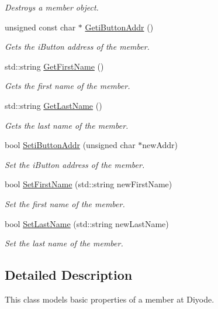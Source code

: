 \begin{DoxyCompactItemize}
\begin{DoxyCompactList}\small\item\em Destroys a member object. \end{DoxyCompactList}\item 
unsigned const char $\ast$ \hyperlink{class_member_acbcc21c318cc1ebb2d5e7d43940d51cf}{Geti\-Button\-Addr} ()
\begin{DoxyCompactList}\small\item\em Gets the i\-Button address of the member. \end{DoxyCompactList}\item 
std\-::string \hyperlink{class_member_a0c06d526ea58beed3ce782f4599e0a8b}{Get\-First\-Name} ()
\begin{DoxyCompactList}\small\item\em Gets the first name of the member. \end{DoxyCompactList}\item 
std\-::string \hyperlink{class_member_aadc78fb6f531930442cc1244455fda80}{Get\-Last\-Name} ()
\begin{DoxyCompactList}\small\item\em Gets the last name of the member. \end{DoxyCompactList}\item 
bool \hyperlink{class_member_a196f091ea8067c5777b2b07184b0b6e1}{Seti\-Button\-Addr} (unsigned char $\ast$new\-Addr)
\begin{DoxyCompactList}\small\item\em Set the i\-Button address of the member. \end{DoxyCompactList}\item 
bool \hyperlink{class_member_adce4ba240d1ee7251d3dd832370d55d9}{Set\-First\-Name} (std\-::string new\-First\-Name)
\begin{DoxyCompactList}\small\item\em Set the first name of the member. \end{DoxyCompactList}\item 
bool \hyperlink{class_member_a8ab627d627dc4a9aa572ed94f492c328}{Set\-Last\-Name} (std\-::string new\-Last\-Name)
\begin{DoxyCompactList}\small\item\em Set the last name of the member. \end{DoxyCompactList}\end{DoxyCompactItemize}


\subsection{Detailed Description}
This class models basic properties of a member at Diyode. 

